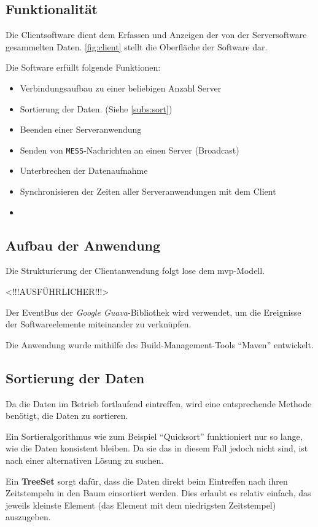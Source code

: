\subsection{Funktionalität}
Die Clientsoftware dient dem Erfassen und Anzeigen der von der Serversoftware
gesammelten Daten. \autoref{fig:client} stellt die Oberfläche der Software dar.

Die Software erfüllt folgende Funktionen:
\begin{itemize}
  \item Verbindungsaufbau zu einer beliebigen Anzahl Server
  \item Sortierung der Daten. (Siehe \autoref{subs:sort})
  \item Beenden einer Serveranwendung
  \item Senden von \texttt{MESS}-Nachrichten an einen Server (Broadcast)
  \item Unterbrechen der Datenaufnahme
  \item Synchronisieren der Zeiten aller Serveranwendungen mit dem Client
  \item <weitere Funktionen> 
\end{itemize}
\subsection{Aufbau der Anwendung}
Die Strukturierung der Clientanwendung folgt lose dem \gls{mvp}-Modell.

<!!!AUSFÜHRLICHER!!!>

Der EventBus der \emph{Google Guava}-Bibliothek wird verwendet, um die
Ereignisse der Softwareelemente miteinander zu verknüpfen.

Die Anwendung wurde mithilfe des Build-Management-Tools "`Maven"'
entwickelt.
\subsection{Sortierung der Daten}\label{subs:sort}
Da die Daten im Betrieb fortlaufend eintreffen, wird eine entsprechende Methode
benötigt, die Daten zu sortieren.

Ein Sortieralgorithmus wie zum Beispiel "`Quicksort"' funktioniert nur so lange,
wie die Daten konsistent bleiben. Da sie das in diesem Fall jedoch nicht sind,
ist nach einer alternativen Lösung zu suchen.

Ein \textbf{TreeSet} sorgt dafür, dass die Daten direkt beim Eintreffen nach
ihren Zeitstempeln in den Baum einsortiert werden. Dies erlaubt es relativ
einfach, das jeweils kleinste Element (das Element mit dem niedrigsten
Zeitstempel) auszugeben. 

